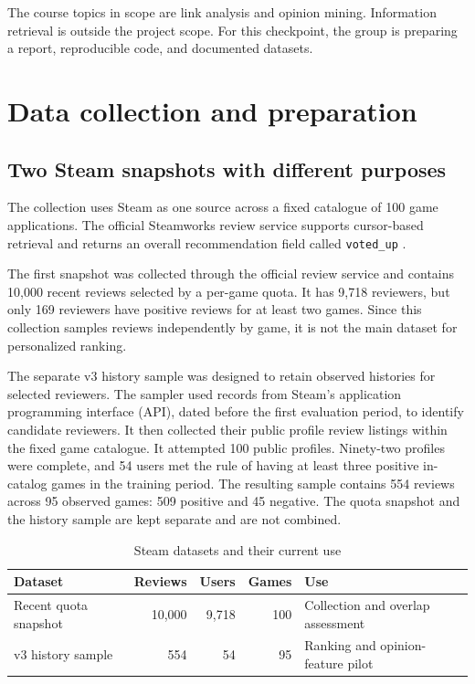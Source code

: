 \documentclass[11pt]{article}
\begin{document}
The course topics in scope are link analysis and opinion mining. Information retrieval is outside the project scope. For this checkpoint, the group is preparing a report, reproducible code, and documented datasets.

\section{Data collection and preparation}

\subsection{Two Steam snapshots with different purposes}

The collection uses Steam as one source across a fixed catalogue of 100 game applications. The official Steamworks review service supports cursor-based retrieval and returns an overall recommendation field called \texttt{voted\_up} \cite{steamworks}.

The first snapshot was collected through the official review service and contains 10,000 recent reviews selected by a per-game quota. It has 9,718 reviewers, but only 169 reviewers have positive reviews for at least two games. Since this collection samples reviews independently by game, it is not the main dataset for personalized ranking.

The separate v3 history sample was designed to retain observed histories for selected reviewers. The sampler used records from Steam's application programming interface (API), dated before the first evaluation period, to identify candidate reviewers. It then collected their public profile review listings within the fixed game catalogue. It attempted 100 public profiles. Ninety-two profiles were complete, and 54 users met the rule of having at least three positive in-catalog games in the training period. The resulting sample contains 554 reviews across 95 observed games: 509 positive and 45 negative. The quota snapshot and the history sample are kept separate and are not combined.

\begin{table}[ht]
\centering
\small
\caption{Steam datasets and their current use}
\begin{tabularx}{\linewidth}{l r r r X}
\toprule
Dataset & Reviews & Users & Games & Use \\
\midrule
Recent quota snapshot & 10,000 & 9,718 & 100 & Collection and overlap assessment \\
v3 history sample & 554 & 54 & 95 & Ranking and opinion-feature pilot \\
\bottomrule
\end{tabularx}
\end{table}
\end{document}
